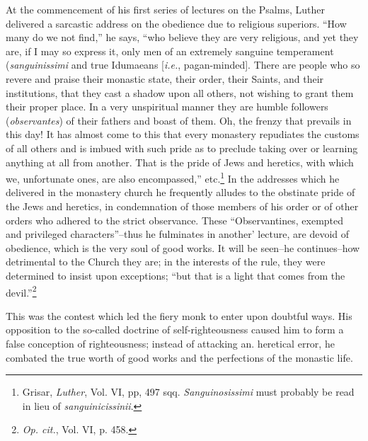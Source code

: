 At the commencement of his first series of lectures on the Psalms, Luther
delivered a sarcastic address on the obedience due to religious superiors.
“How many do we not find,” he says, “who believe they are very religious,
and yet they are, if I may so express it, only men of an extremely
sanguine temperament (\textit{sanguinissimi} and true Idumaeans [\textit{i.e.}, pagan-minded].
There are people who so revere and praise their monastic
state, their order, their Saints, and their institutions, that they cast a
shadow upon all others, not wishing to grant them their proper place.
In a very unspiritual manner they are humble followers (\textit{observantes}) of their
fathers and boast of them. Oh, the frenzy that prevails in this day! It has
almost come to this that every monastery repudiates the customs of all
others and is imbued with such pride as to preclude taking over or learning
anything at all from another. That is the pride of Jews and heretics,
with which we, unfortunate ones, are also encompassed,” etc.\footnote
{Grisar, \textit{Luther}, Vol. VI, pp, 497 sqq. \textit{Sanguinosissimi} must probably be read in lieu of
\textit{sanguinicissinii}.}
In the
addresses which he delivered in the monastery church he frequently alludes
to the obstinate pride of the Jews and heretics, in condemnation of those
members of his order or of other orders who adhered to the strict
observance. These “Observantines, exempted and privileged characters”--thus he
fulminates in another’ lecture, are devoid of obedience, which is the very
soul of good works. It will be seen--he continues--how detrimental to the
Church they are; in the interests of the rule, they were determined to
insist upon exceptions; “but that is a light that comes from the devil.”\footnote
{\textit{\textit{Op. cit.}}, Vol. VI, p. 458.}

This was the contest which led the fiery monk to enter upon
doubtful ways. His opposition to the so-called doctrine of self-righteousness caused him to form a false conception of righteousness;
instead of attacking an. heretical error, he combated the true worth
of good works and the perfections of the monastic life.

